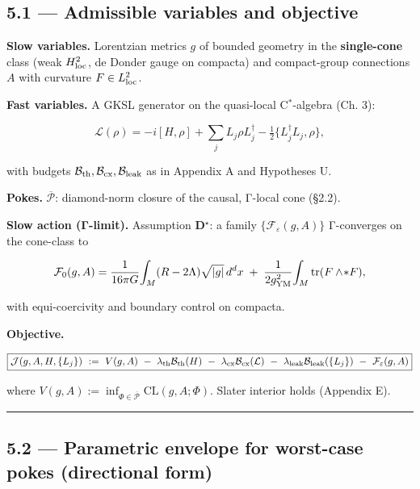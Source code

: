 \documentclass[
]{article}
\numberwithin{equation}{section}
\begin{document}
\hypertarget{admissible-variables-and-objective}{%
\subsection{5.1 --- Admissible variables and
objective}\label{admissible-variables-and-objective}}

\textbf{Slow variables.} Lorentzian metrics \(g\) of bounded geometry in
the \textbf{single-cone} class (weak \(H^2_{\rm loc}\), de Donder gauge
on compacta) and compact-group connections \(A\) with curvature
\(F\in L^2_{\rm loc}\).

\textbf{Fast variables.} A GKSL generator on the quasi-local
C\(^*\)-algebra (Ch. 3):

\[
\mathcal L(\rho)=-i[H,\rho]+\sum_j L_j\rho L_j^\dagger-\tfrac12\{L_j^\dagger L_j,\rho\},
\]

with budgets
\(\mathcal B_{\rm th},\mathcal B_{\rm cx},\mathcal B_{\rm leak}\) as in
Appendix A and Hypotheses U.

\textbf{Pokes.} \(\overline{\mathcal P}\): diamond-norm closure of the
causal, Γ-local cone (§2.2).

\textbf{Slow action (Γ-limit).} Assumption \textbf{D\(^\star\)}: a
family \(\{\mathcal F_\varepsilon(g,A)\}\) Γ-converges on the cone-class
to

\[
\mathcal F_0(g,A)=\frac{1}{16\pi G}\!\int_M (R-2\Lambda)\sqrt{|g|}\,d^dx\;+\;\frac{1}{2g_{\rm YM}^2}\!\int_M \mathrm{tr}(F\wedge\!*F),
\]

with equi-coercivity and boundary control on compacta.

\textbf{Objective.}

\[
\boxed{
\mathcal J(g,A,H,\{L_j\})\ :=\ V(g,A)\ -\ \lambda_{\rm th}\mathcal B_{\rm th}(H)\ -\ \lambda_{\rm cx}\mathcal B_{\rm cx}(\mathcal L)\ -\ \lambda_{\rm leak}\mathcal B_{\rm leak}(\{L_j\})\ -\ \mathcal F_\varepsilon(g,A)
}
\]

where
\(V(g,A):=\inf_{\Phi\in\overline{\mathcal P}}\mathrm{CL}(g,A;\Phi)\).
Slater interior holds (Appendix E).

\begin{center}\rule{0.5\linewidth}{0.5pt}\end{center}

\hypertarget{parametric-envelope-for-worst-case-pokes-directional-form}{%
\subsection{5.2 --- Parametric envelope for worst-case pokes
(directional
form)}\label{parametric-envelope-for-worst-case-pokes-directional-form}}
\end{document}
